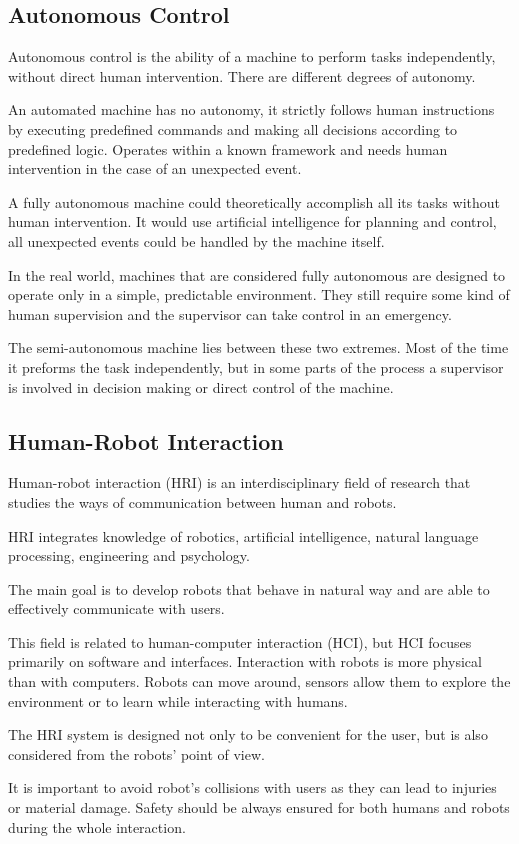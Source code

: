 \subsection{Autonomous Control}
Autonomous control is the ability of a machine to perform tasks independently, without direct human intervention. There are different degrees of autonomy.\par
An automated machine has no autonomy, it strictly follows human instructions by executing predefined commands and making all decisions according to predefined logic. Operates within a known framework and needs human intervention in the case of an unexpected event.\par
A fully autonomous machine could theoretically accomplish all its tasks without human intervention. It would use artificial intelligence for planning and control, 
all unexpected events could be handled by the machine itself.\par
In the real world, machines that are considered fully autonomous are designed to operate only in a simple, predictable environment. They still require some kind of human supervision and the supervisor can take control in an emergency.\par
The semi-autonomous machine lies between these two extremes. Most of the time it preforms the task independently, but in some parts of the process a supervisor is involved in decision making or direct control of the machine.\par


\subsection{Human-Robot Interaction}
Human-robot interaction (HRI) is an interdisciplinary field of research that studies the ways of communication between human and robots.\par
HRI integrates knowledge of robotics, artificial intelligence, natural language processing, engineering and psychology.\par
The main goal is to develop robots that behave in natural way and are able to effectively communicate with users.\par
This field is related to human-computer interaction (HCI), but HCI focuses primarily on software and interfaces. Interaction with robots is more physical than with computers. Robots can move around, sensors allow them to explore the environment or to learn while interacting with humans.\par
The HRI system is designed not only to be convenient for the user, but is also considered from the robots' point of view.\par
It is important to avoid robot's collisions with users as they can lead to injuries or material damage. Safety should be always ensured for both humans and robots during the whole interaction.\par

